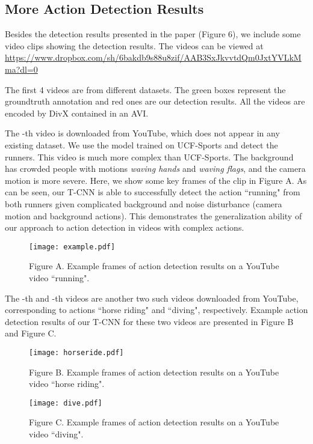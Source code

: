 \documentclass[10pt,twocolumn,letterpaper]{article}
\begin{document}
\subsection{More Action Detection Results}
Besides the detection results presented in the paper (Figure 6), we include some video clips showing the detection results. The videos can be viewed at \url{https://www.dropbox.com/sh/6bakdb9s88u8zif/AAB3SxJkvvtdQm0JxtYVLkMma?dl=0}

The first 4 videos are from different datasets. The green boxes represent the groundtruth annotation and red ones are our detection results. All the videos are encoded by DivX contained in an AVI.

The -th video is downloaded from YouTube, which does not appear in any existing dataset. We use the model trained on UCF-Sports and detect the runners. This video is much more complex than UCF-Sports. The background has crowded people with motions \eg \textit{waving hands} and \textit{waving flags}, and the camera motion is more severe. Here, we show some key frames of the clip in Figure A. As can be seen, our T-CNN is able to successfully detect the action ``running" from both runners given complicated background and noise disturbance (\eg camera motion and background actions). This demonstrates the generalization ability of our approach to action detection in videos with complex actions.

\begin{figure}[!h]
\texttt{[image: example.pdf]}
\caption*{Figure A. Example frames of action detection results on a YouTube video ``running".}
\end{figure}

The -th and -th videos are another two such videos downloaded from YouTube, corresponding to actions ``horse riding" and ``diving", respectively. Example action detection results of our T-CNN for these two videos are presented in Figure B and Figure C.


\begin{figure}[!h]
\texttt{[image: horseride.pdf]}
\caption*{Figure B. Example frames of action detection results on a YouTube video ``horse riding".}
\end{figure}


\begin{figure}[!h]
\texttt{[image: dive.pdf]}
\caption*{Figure C. Example frames of action detection results on a YouTube video ``diving".}
\end{figure}
\end{document}
